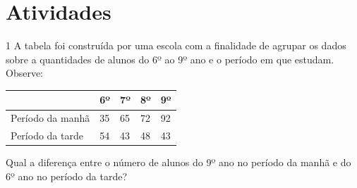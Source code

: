 
\section{Atividades}

\num{1} A tabela foi construída por uma escola com a finalidade de agrupar
os dados sobre a quantidades de alunos do 6º ao 9º ano e o período
em que estudam. Observe:

\begin{longtable}[]{@{}lllll@{}}
\toprule
& 6º & 7º & 8º & 9º\tabularnewline
\midrule
\endhead
Período da manhã & 35 & 65 & 72 & 92\tabularnewline
Período da tarde & 54 & 43 & 48 & 43\tabularnewline
\bottomrule
\end{longtable}

Qual a diferença entre o número de alunos do 9º ano no período da manhã
e do 6º ano no período da tarde?

